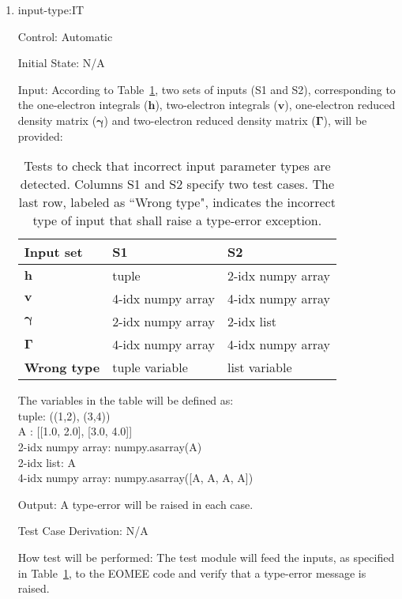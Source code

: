 \documentclass[12pt, titlepage]{article}
\begin{document}
\begin{enumerate}

\item{input-type:IT\\}

Control: Automatic
					
Initial State: N/A
					
Input: According to Table~\ref{Table:typeerror}, two sets of inputs (S1 and 
S2), corresponding to the one-electron integrals ($\mathbf{h}$), 
two-electron integrals ($\mathbf{v}$), one-electron reduced density matrix 
($\boldsymbol{\gamma}$) and two-electron reduced density matrix 
($\boldsymbol{\Gamma}$), will 
be provided:

\begin{table}[h!]
	\centering
	\noindent \begin{tabular}{l l l } 
		\toprule		
		\textbf{Input set} & \textbf{S1} & \textbf{S2}\\
		\midrule 
		$\mathbf{h}$& tuple & 2-idx numpy array\\
		$\mathbf{v}$& 4-idx numpy array& 4-idx numpy array\\
		$\boldsymbol{\gamma}$& 2-idx numpy array& 2-idx list\\
		$\boldsymbol{\Gamma}$& 4-idx numpy array& 4-idx numpy array\\
		\textbf{Wrong type}& tuple variable& list variable\\
		\bottomrule
	\end{tabular}
	\caption{Tests to check that incorrect input parameter types are detected. 
	Columns S1 and S2 specify two test cases. The last row, labeled as ``Wrong 
	type", 
	indicates the incorrect type of input that 
	shall raise a type-error exception.}
	\label{Table:typeerror}
\end{table}

The variables in the table will be defined as:\\
tuple: ((1,2), (3,4))\\
A : [[1.0, 2.0], [3.0, 4.0]] \\
2-idx numpy array: numpy.asarray(A)\\
2-idx list: A\\
4-idx numpy array: numpy.asarray([A, A, A, A])
	
Output: A type-error will be raised in each case. 

Test Case Derivation: N/A
					
How test will be performed: The test module will feed the inputs, as specified 
in Table~\ref{Table:typeerror}, to the EOMEE code and verify that a type-error 
message is raised.


\end{enumerate}
\end{document}
